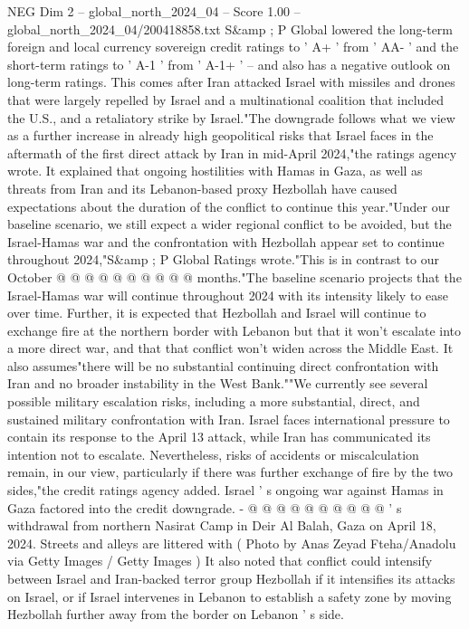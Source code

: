 \begin{textsample}{NEG Dim 2 – global\_north\_2024\_04 – Score 1.00 – global\_north\_2024\_04/200418858.txt}  \label{ex:f2_neg_184}
S\&amp ; P Global lowered the long-term foreign and local currency sovereign credit ratings to ' A+ ' from ' AA- ' and the short-term ratings to ' A-1 ' from ' A-1+ ' -- and also has a negative outlook on long-term ratings.
This comes after Iran attacked Israel with missiles and drones that were largely repelled by Israel and a multinational coalition that included the U.S., and a retaliatory strike by Israel."The downgrade follows what we view as a further increase in already high geopolitical risks that Israel faces in the aftermath of the first direct attack by Iran in mid-April 2024,"the ratings agency wrote.
It explained that ongoing hostilities with Hamas in Gaza, as well as threats from Iran and its Lebanon-based proxy Hezbollah have caused expectations about the duration of the conflict to continue this year."Under our baseline scenario, we still expect a wider regional conflict to be avoided, but the Israel-Hamas war and the confrontation with Hezbollah appear set to continue throughout 2024,"S\&amp ; P Global Ratings wrote."This is in contrast to our October @ @ @ @ @ @ @ @ @ @ months."The baseline scenario projects that the Israel-Hamas war will continue throughout 2024 with its intensity likely to ease over time.
Further, it is expected that Hezbollah and Israel will continue to exchange fire at the northern border with Lebanon but that it won't escalate into a more direct war, and that that conflict won't widen across the Middle East.
It also assumes"there will be no substantial continuing direct confrontation with Iran and no broader instability in the West Bank.""We currently see several possible military escalation risks, including a more substantial, direct, and sustained military confrontation with Iran.
Israel faces international pressure to contain its response to the April 13 attack, while Iran has communicated its intention not to escalate.
Nevertheless, risks of accidents or miscalculation remain, in our view, particularly if there was further exchange of fire by the two sides,"the credit ratings agency added.
Israel ' s ongoing war against Hamas in Gaza factored into the credit downgrade. - @ @ @ @ @ @ @ @ @ @ ' s withdrawal from northern Nasirat Camp in Deir Al Balah, Gaza on April 18, 2024.
Streets and alleys are littered with ( Photo by Anas Zeyad Fteha/Anadolu via Getty Images / Getty Images ) It also noted that conflict could intensify between Israel and Iran-backed terror group Hezbollah if it intensifies its attacks on Israel, or if Israel intervenes in Lebanon to establish a safety zone by moving Hezbollah further away from the border on Lebanon ' s side.

\end{textsample}
